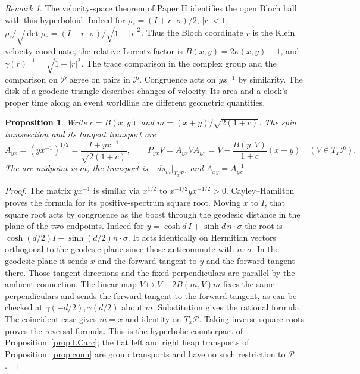 \documentclass[11pt,reqno]{amsart}
\newtheorem{proposition}[theorem]{Proposition}
\theoremstyle{definition}
\theoremstyle{remark}
\newtheorem{remark}[theorem]{Remark}
\numberwithin{equation}{section}
\begin{document}
\begin{remark}\label{m3:velocity}
The velocity-space theorem of Paper II \cite[Thm.~53]{Companion}
identifies the open Bloch ball with this hyperboloid. Indeed for
\(\rho_r=(I+r\cdot\sigma)/2\), \(|r|<1\),
\(\rho_r/\sqrt{\det\rho_r}=(I+r\cdot\sigma)/\sqrt{1-|r|^2}\).
Thus the Bloch coordinate \(r\) is the Klein velocity coordinate,
the relative Lorentz factor is \(B(x,y)=2\kappa(x,y)-1\), and
\(\gamma(r)^{-1}=\sqrt{1-|r|^2}\).
The trace comparison in the complex group and the comparison on
\(\mathcal P\) agree on pairs in \(\mathcal P\). Congruence acts on \(yx^{-1}\)
by similarity. The disk of a geodesic triangle describes changes of
velocity. Its area and a clock's proper time along an event
worldline are different geometric quantities.
\end{remark}

\begin{proposition}\label{m3:transport}
Write \(c=B(x,y)\) and \(m=(x+y)/\sqrt{2(1+c)}\).
The spin transvection and its tangent transport are
\[
 A_{yx}=(yx^{-1})^{1/2}=\frac{I+yx^{-1}}{\sqrt{2(1+c)}},\qquad
 P_{yx}V=A_{yx}VA_{yx}^\dagger
         =V-\frac{B(y,V)}{1+c}(x+y)\quad(V\in T_x\mathcal P).
\]
The arc midpoint is \(m\), the transport is \(-ds_m|_{T_x\mathcal P}\),
and \(A_{xy}=A_{yx}^{-1}\).
\end{proposition}
\begin{proof}
The matrix \(yx^{-1}\) is similar via \(x^{1/2}\) to
\(x^{-1/2}yx^{-1/2}>0\). Cayley--Hamilton proves the formula for its
positive-spectrum square root. Moving \(x\) to \(I\), that square root
acts by congruence as the boost through the geodesic distance in the
plane of the two endpoints. Indeed for \(y=\cosh d\,I+\sinh d\,n\cdot\sigma\)
the root is \(\cosh(d/2)I+\sinh(d/2)n\cdot\sigma\).
It acts identically on Hermitian vectors orthogonal to the geodesic
plane since those anticommute with \(n\cdot\sigma\). In the geodesic
plane it sends \(x\) and the forward tangent to \(y\) and the forward
tangent there. Those tangent directions and the fixed perpendiculars
are parallel by the ambient connection. The linear map
\(V\mapsto V-2B(m,V)m\) fixes the same perpendiculars and sends the
forward tangent to the forward tangent, as can be checked at
\(\gamma(-d/2),\gamma(d/2)\) about \(m\). Substitution gives the rational
formula. The coincident case gives \(m=x\) and identity on \(T_x\mathcal P\).
Taking inverse square roots proves the reversal formula. This is the
hyperbolic counterpart of Proposition~\ref{prop:LCarc}; the flat left
and right heap transports of Proposition~\ref{prop:conn} are group
transports and have no such restriction to \(\mathcal P\).
\end{proof}
\end{document}
